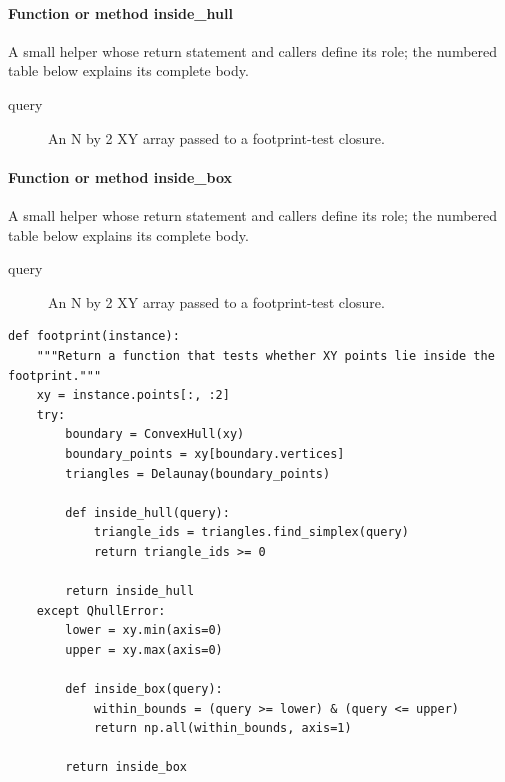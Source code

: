 \documentclass[11pt,a4paper]{book}
\begin{document}
\paragraph{Function or method inside\_hull}
A small helper whose return statement and callers define its role; the numbered table below explains its complete body.

\begin{description}
\item[query] An N by 2 XY array passed to a footprint-test closure.
\end{description}

\paragraph{Function or method inside\_box}
A small helper whose return statement and callers define its role; the numbered table below explains its complete body.

\begin{description}
\item[query] An N by 2 XY array passed to a footprint-test closure.
\end{description}

\begin{lstlisting}[firstnumber=7]
def footprint(instance):
    """Return a function that tests whether XY points lie inside the footprint."""
    xy = instance.points[:, :2]
    try:
        boundary = ConvexHull(xy)
        boundary_points = xy[boundary.vertices]
        triangles = Delaunay(boundary_points)

        def inside_hull(query):
            triangle_ids = triangles.find_simplex(query)
            return triangle_ids >= 0

        return inside_hull
    except QhullError:
        lower = xy.min(axis=0)
        upper = xy.max(axis=0)

        def inside_box(query):
            within_bounds = (query >= lower) & (query <= upper)
            return np.all(within_bounds, axis=1)

        return inside_box


\end{lstlisting}
\end{document}
